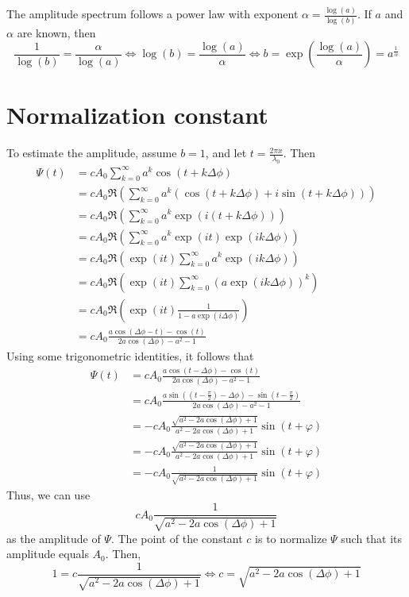 \documentclass[a4paper, 12pt]{scrartcl}
\begin{document}
The amplitude spectrum follows a power law with exponent $\alpha = \frac{\log(a)}{\log(b)}$. If $a$ and $\alpha$ are known, then
\[
 \frac{1}{\log(b)} = \frac{\alpha}{\log(a)} \Leftrightarrow
 \log(b) = \frac{\log(a)}{\alpha}\Leftrightarrow
 b = \exp\left(\frac{\log(a)}{\alpha}\right) = a^{\frac{1}{\alpha}}
\]


\section{Normalization constant}
To estimate the amplitude, assume $b = 1$, and let $t = \frac{2\pi x}{\lambda_0}$. Then
\[
\begin{aligned}
 \Psi(t) &= c A_0\sum_{k=0}^\infty a^k\cos\left(t + k\Delta \phi\right)\\
	&= cA_0\Re\left( \sum_{k=0}^\infty a^k \left(\cos\left(t + k\Delta \phi\right) + i \sin\left(t + k\Delta \phi\right)\right)\right)\\
	&= cA_0\Re\left( \sum_{k=0}^\infty a^k \exp\left(i\left(t + k\Delta\phi\right)\right)\right)\\
	&= cA_0\Re\left( \sum_{k=0}^\infty a^k \exp\left(i t\right)\exp\left(i k\Delta\phi\right)\right)\\
	&= cA_0\Re\left(\exp\left(i t\right) \sum_{k=0}^\infty a^k \exp\left(i k\Delta\phi\right)\right)\\
	&= cA_0\Re\left(\exp\left(i t\right) \sum_{k=0}^\infty \left(a \exp\left(i k\Delta\phi\right)\right)^k\right)\\
	&= cA_0\Re\left(\exp\left(i t\right) \frac{1}{1 - a\exp\left(i\Delta\phi\right)}\right)\\
	&= cA_0\frac{a\cos\left(\Delta\phi - t\right) - \cos(t)}
		{2a\cos\left( \Delta\phi \right) -a^{2}-1}
 \end{aligned}
\]
Using some trigonometric identities, it follows that
\[
\begin{aligned}
 \Psi(t) &= cA_0\frac{a \cos{\left( t - \Delta\phi\right) }-\cos(t)}{2 a \cos\left( \Delta\phi \right) - a^2-1} \\
 &= cA_0\frac{a \sin\left( \left(t - \frac{\pi}{2}\right) - \Delta\phi\right)-\sin\left(t - \frac{\pi}{2}\right)}{2 a \cos\left( \Delta\phi \right) - a^2-1}\\
 &= -cA_0\frac{\sqrt{a^2 - 2a\cos\left(\Delta\phi\right) + 1}}
 {a^2 - 2 a \cos\left(\Delta\phi \right) + 1}\sin(t + \varphi) \\
 &= -cA_0\frac{\sqrt{a^2 - 2a\cos\left(\Delta\phi\right) + 1}}
 {a^2 - 2 a \cos\left(\Delta\phi \right) + 1}\sin(t + \varphi) \\
  &= -cA_0\frac{1}{\sqrt{a^2 - 2a\cos\left(\Delta\phi\right) + 1}}\sin(t + \varphi)
\end{aligned}
\]
Thus, we can use
\[
 cA_0\frac{1}{\sqrt{a^2 - 2a\cos\left(\Delta\phi\right) + 1}}
\]
as the amplitude of $\Psi$. The point of the constant $c$ is to normalize $\Psi$ such that its amplitude equals $A_0$. Then,
\[
 1 = c\frac{1}{\sqrt{a^2 - 2a\cos\left(\Delta\phi\right) + 1}} \Leftrightarrow c = \sqrt{a^2 - 2a\cos\left(\Delta\phi\right) + 1}
\]
\end{document}
